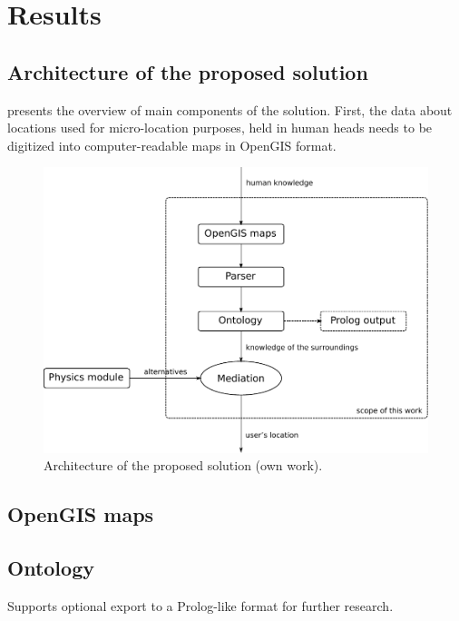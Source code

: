 \chapter{Results}
\label{cha:results}


\section{Architecture of the proposed solution}
\label{sec:architecture}

 presents the overview of main components of the solution. First, the data about locations used for micro-location purposes, held in human heads needs to be digitized into computer-readable maps in OpenGIS format.


\begin{figure}
	\centering
	\includegraphics[width=\textwidth]{architecture}
	\caption{Architecture of the proposed solution (own work).}
	\label{fig:architecture}
\end{figure}

\section{OpenGIS maps}

\section{Ontology}

Supports optional export to a Prolog-like format for further research.

